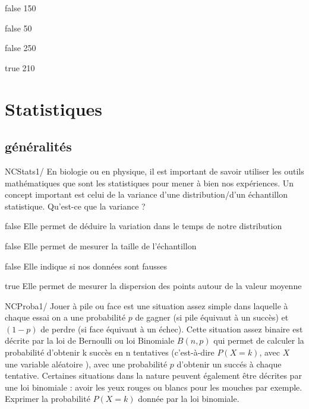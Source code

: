 \documentclass[11pt]{article}
\begin{document}
            \begin{reponses}
            	\item[false]  150
            	\item[false]  50
                \item[false]  250
                \item[true]   210
            \end{reponses}
	

	

			\section{Statistiques}
			
			  \subsection{généralités}

            \begin{question}{NC}{Stats}{1}{/} 
				En biologie ou en physique, il est important de savoir utiliser les outils mathématiques que sont les statistiques pour mener à bien nos expériences. Un concept important est celui de la variance d'une distribution/d'un échantillon statistique. Qu'est-ce que la variance ? 

            \end{question}

            \begin{reponses}
            	\item[false]  Elle permet de déduire la variation dans le temps de notre distribution
            	\item[false]  Elle permet de mesurer la taille de l'échantillon 
                \item[false]  Elle indique si nos données sont fausses
                \item[true]   Elle permet de mesurer la dispersion des points autour de la valeur moyenne 
            \end{reponses}
            
            

            
            
            \begin{question}{NC}{Proba}{1}{/} 
				Jouer à pile ou face est une situation assez simple dans laquelle à chaque essai on a une probabilité $p$ de gagner (si pile équivaut à un succès) et $(1-p)$ de perdre (si face équivaut à un échec). Cette situation assez binaire est décrite par la loi de Bernoulli ou loi Binomiale $B(n,p)$ qui permet de calculer la probabilité d'obtenir k succès en n tentatives (c'est-à-dire $P(X=k)$, avec $X$ une variable aléatoire ), avec une probabilité $p$ d'obtenir un succés à chaque tentative. Certaines situations dans la nature peuvent également être décrites par une loi binomiale : avoir les yeux rouges ou blancs pour les mouches par exemple. Exprimer la probabilité $P(X=k)$ donnée par la loi binomiale.

            \end{question}
\end{document}
